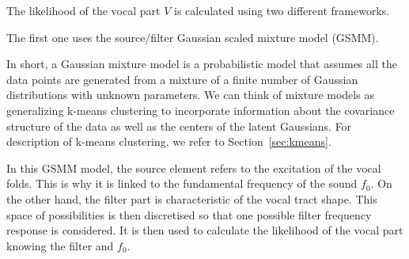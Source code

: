 The likelihood of the vocal part $V$ is calculated using two different frameworks. 

The first one uses the source/filter Gaussian scaled mixture model (GSMM). 

In short, a Gaussian mixture model is a probabilistic model that assumes all the data points are generated from a mixture of a finite number of Gaussian distributions with unknown parameters. We can think of mixture models as generalizing k-means clustering to incorporate information about the covariance structure of the data as well as the centers of the latent Gaussians. For description of k-means clustering, we refer to Section~\ref{sec:kmeans}.

In this GSMM model, the source element refers to the excitation of the vocal folds. This is why it is linked to the fundamental frequency of the sound $f_{\text{0}}$. On the other hand, the filter part is characteristic of the vocal tract shape. This space of possibilities is then discretised so that one possible filter frequency response is considered. It is then used to calculate the likelihood of the vocal part knowing the filter and $f_{\text{0}}$.


